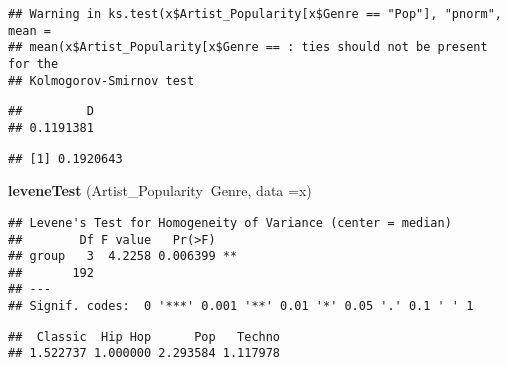 \documentclass[
]{article}
\newenvironment{Shaded}{\begin{snugshade}}{\end{snugshade}}
\newcommand{\DataTypeTok}[1]{\textcolor[rgb]{0.13,0.29,0.53}{#1}}
\newcommand{\FloatTok}[1]{\textcolor[rgb]{0.00,0.00,0.81}{#1}}
\newcommand{\KeywordTok}[1]{\textcolor[rgb]{0.13,0.29,0.53}{\textbf{#1}}}
\newcommand{\NormalTok}[1]{#1}
\newcommand{\OperatorTok}[1]{\textcolor[rgb]{0.81,0.36,0.00}{\textbf{#1}}}
\newcommand{\OtherTok}[1]{\textcolor[rgb]{0.56,0.35,0.01}{#1}}
\newcommand{\StringTok}[1]{\textcolor[rgb]{0.31,0.60,0.02}{#1}}
\begin{document}
\begin{verbatim}
## Warning in ks.test(x$Artist_Popularity[x$Genre == "Pop"], "pnorm", mean =
## mean(x$Artist_Popularity[x$Genre == : ties should not be present for the
## Kolmogorov-Smirnov test
\end{verbatim}

\begin{verbatim}
##         D 
## 0.1191381
\end{verbatim}

\begin{Shaded}
\end{Shaded}

\begin{verbatim}
## [1] 0.1920643
\end{verbatim}

\begin{Shaded}
\begin{Highlighting}[]
\KeywordTok{leveneTest}\NormalTok{ (Artist_Popularity}\OperatorTok{~}\NormalTok{Genre, }\DataTypeTok{data =}\NormalTok{x)}
\end{Highlighting}
\end{Shaded}

\begin{verbatim}
## Levene's Test for Homogeneity of Variance (center = median)
##        Df F value   Pr(>F)   
## group   3  4.2258 0.006399 **
##       192                    
## ---
## Signif. codes:  0 '***' 0.001 '**' 0.01 '*' 0.05 '.' 0.1 ' ' 1
\end{verbatim}

\begin{Shaded}
\end{Shaded}

\begin{verbatim}
##  Classic  Hip Hop      Pop   Techno 
## 1.522737 1.000000 2.293584 1.117978
\end{verbatim}
\end{document}
